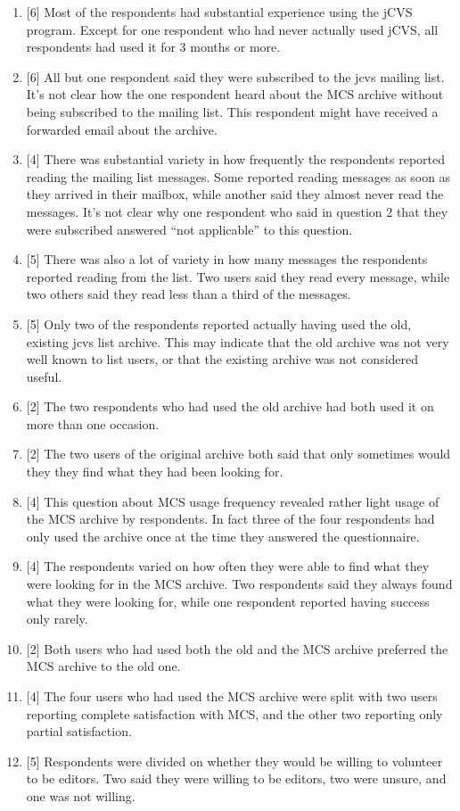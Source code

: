 \begin{enumerate}
\item{[6] Most of the respondents had substantial experience using the jCVS
    program. Except for one respondent who had never actually used jCVS, all
    respondents had used it for 3 months or more.}
\item{[6] All but one respondent said they were subscribed to the jcvs mailing
    list. It's not clear how the one respondent heard about the MCS archive
    without being subscribed to the mailing list. This respondent might have
    received a forwarded email about the archive.}
\item{[4] There was substantial variety in how frequently the respondents
    reported reading the mailing list messages. Some reported reading messages
    as soon as they arrived in their mailbox, while another said they almost
    never read the messages. It's not clear why one respondent who said in
    question 2 that they were subscribed answered ``not applicable'' to this
    question.}
\item{[5] There was also a lot of variety in how many messages the respondents
    reported reading from the list. Two users said they read every message,
    while two others said they read less than a third of the messages.}
\item{[5] Only two of the respondents reported actually having used the old,
    existing jcvs list archive. This may indicate that the old archive was not
    very well known to list users, or that the existing archive was not
    considered useful.}
\item{[2] The two respondents who had used the old archive had both used it on
    more than one occasion.}
\item{[2] The two users of the original archive both said that only sometimes
    would they they find what they had been looking for.}
\item{[4] This question about MCS usage frequency revealed rather light usage
    of the MCS archive by respondents. In fact three of the four respondents
    had only used the archive once at the time they answered the
    questionnaire.}
\item{[4] The respondents varied on how often they were able to find what they
    were looking for in the MCS archive. Two respondents said they always found
    what they were looking for, while one respondent reported having success
    only rarely.}
\item{[2] Both users who had used both the old and the MCS archive preferred
    the MCS archive to the old one.}
\item{[4] The four users who had used the MCS archive were split with two users
    reporting complete satisfaction with MCS, and the other two reporting only
    partial satisfaction.}
\item{[5] Respondents were divided on whether they would be willing to
    volunteer to be editors. Two said they were willing to be editors, two were
    unsure, and one was not willing.}
\end{enumerate}

